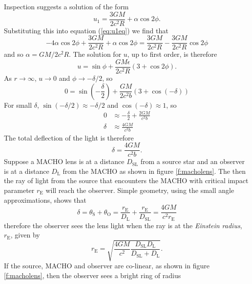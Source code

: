 Inspection suggests a solution of the form
\begin{equation}
u_1 = \frac{3GM}{2c^2 R} + \alpha \cos 2\phi.
\end{equation}
Substituting this into equation (\ref{eq:u1eq}) we find that
\begin{equation}
-4\alpha \cos 2\phi + \frac{3GM}{2c^2 R} + \alpha\cos 2\phi =
\frac{3GM}{2c^2 R} - \frac{3GM}{2c^2 R} \cos 2\phi
\end{equation}
and so $\alpha = GM/2c^2 R$. The solution for $u$, up to first order, is
therefore
\begin{equation}
u = \sin \phi + \frac{GM\epsilon}{2c^2 R}\left(3 + \cos 2\phi\right).
\end{equation}
As $r \rightarrow \infty$, $u \rightarrow 0$ and $\phi \rightarrow - \delta/2$,
so
\begin{equation}
0 = \sin \left(-\frac{\delta}{2}\right) + 
\frac{GM}{2c^2 b} \left(3 + \cos(-\delta)\right)
\end{equation}
For small $\delta$, $\sin(-\delta/2) \approx -\delta/2$ and $\cos(-\delta)
\approx 1$, so
\begin{align}
0 &\approx - \frac{\delta}{2} + \frac{2GM}{c^2 b} \\
\delta &\approx \frac{4GM}{c^2b}
\end{align}
The total deflection of the light is therefore
\begin{equation}
\delta = \frac{4GM}{c^2 b}.
\end{equation}
Suppose a MACHO lens is at a distance $D_\mathrm{SL}$ from a source star and
an observer is at a distance $D_\mathrm{L}$ from the MACHO as shown in figure
\ref{f:macholens}. The then the ray of light from the source that encounters
the MACHO with critical impact parameter $r_\mathrm{E}$ will reach the
observer. Simple geometry, using the small angle approximations, shows that
\begin{equation}
\delta = \theta_\mathrm{S} + \theta_\mathrm{O} =
\frac{r_\mathrm{E}}{D_\mathrm{L}} + \frac{r_\mathrm{E}}{D_\mathrm{SL}} =
\frac{4GM}{c^2r_\mathrm{E}}
\end{equation}
therefore the observer sees the lens light when the ray is at the
\emph{Einstein radius}, $r_\mathrm{E}$, given by
\begin{equation}
r_\mathrm{E} = \sqrt{\frac{4GM}{c^2} \frac{D_\mathrm{SL} D_\mathrm{L}}
{D_\mathrm{SL} + D_\mathrm{L}}}.
\end{equation}
If the source, MACHO and observer are co-linear, as shown in figure
\ref{f:macholens}, then the observer sees a bright ring of radius
